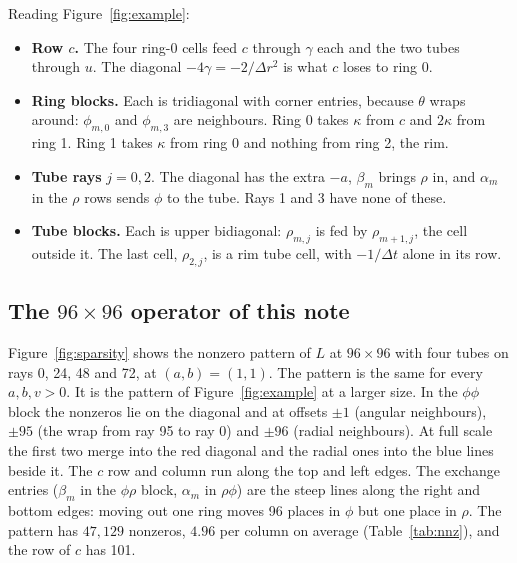 \documentclass[11pt]{article}
\begin{document}
Reading Figure~\ref{fig:example}:
\begin{itemize}
\item \textbf{Row $c$.} The four ring-0 cells feed $c$ through $\gamma$ each and the two tubes through
  $u$. The diagonal $-4\gamma = -2/\Delta r^2$ is what $c$ loses to ring 0.
\item \textbf{Ring blocks.} Each is tridiagonal with corner entries, because $\theta$ wraps around:
  $\phi_{m,0}$ and $\phi_{m,3}$ are neighbours. Ring 0 takes $\kappa$ from $c$ and $2\kappa$ from ring 1.
  Ring 1 takes $\kappa$ from ring 0 and nothing from ring 2, the rim.
\item \textbf{Tube rays} $j = 0, 2$. The diagonal has the extra $-a$, $\beta_m$ brings $\rho$ in, and
  $\alpha_m$ in the $\rho$ rows sends $\phi$ to the tube. Rays 1 and 3 have none of these.
\item \textbf{Tube blocks.} Each is upper bidiagonal: $\rho_{m,j}$ is fed by $\rho_{m+1,j}$, the cell
  outside it. The last cell, $\rho_{2,j}$, is a rim tube cell, with $-1/\Delta t$ alone in its row.
\end{itemize}

\subsection{The \texorpdfstring{$96 \times 96$}{96 x 96} operator of this note}

Figure~\ref{fig:sparsity} shows the nonzero pattern of $L$ at $96 \times 96$ with four tubes on rays 0, 24,
48 and 72, at $(a, b) = (1, 1)$. The pattern is the same for every $a, b, v > 0$. It is the pattern of
Figure~\ref{fig:example} at a larger size. In the $\phi\phi$ block the nonzeros lie on the diagonal and
at offsets $\pm 1$ (angular neighbours), $\pm 95$ (the wrap from ray 95 to ray 0) and $\pm 96$ (radial
neighbours). At full scale the first two merge into the red diagonal and the radial ones into the blue
lines beside it. The $c$ row and column run along the top and left edges. The exchange entries
($\beta_m$ in the $\phi\rho$ block, $\alpha_m$ in $\rho\phi$) are the steep lines along the right and
bottom edges: moving out one ring moves 96 places in $\phi$ but one place in $\rho$. The pattern has
$47{,}129$ nonzeros, $4.96$ per column on average (Table~\ref{tab:nnz}), and the row of $c$ has 101.
\end{document}
